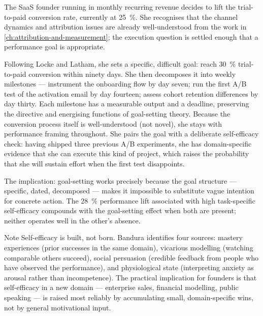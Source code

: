 \begin{example}
The SaaS founder running  in monthly recurring revenue decides to lift the
trial-to-paid conversion rate, currently at \qty{25}{\percent}. She recognises that the channel
dynamics and attribution issues are already well-understood from the work in
\cref{ch:attribution-and-measurement}; the execution question is settled enough that a
performance goal is appropriate.

Following Locke and Latham, she sets a specific, difficult goal: reach \qty{30}{\percent}
trial-to-paid conversion within ninety days. She then decomposes it into weekly milestones ---
instrument the onboarding flow by day seven; run the first A/B test of the activation email by
day fourteen; assess cohort retention differences by day thirty. Each milestone has a
measurable output and a deadline, preserving the directive and energising functions of
goal-setting theory. Because the conversion process itself is well-understood (not novel), she
stays with performance framing throughout. She pairs the goal with a deliberate self-efficacy
check: having shipped three previous A/B experiments, she has domain-specific evidence that she
can execute this kind of project, which raises the probability that she will sustain effort when
the first test disappoints.

The implication: goal-setting works precisely because the goal structure --- specific, dated,
decomposed --- makes it impossible to substitute vague intention for concrete action. The
\qty{28}{\percent} performance lift associated with high task-specific self-efficacy compounds
with the goal-setting effect when both are present; neither operates well in the other's absence.
\end{example}

\begin{admonition}{Note}
Self-efficacy is built, not born. Bandura identifies four sources: mastery experiences (prior
successes in the same domain), vicarious modelling (watching comparable others succeed),
social persuasion (credible feedback from people who have observed the performance), and
physiological state (interpreting anxiety as arousal rather than incompetence). The practical
implication for founders is that self-efficacy in a new domain --- enterprise sales, financial
modelling, public speaking --- is raised most reliably by accumulating small, domain-specific
wins, not by general motivational input.
\end{admonition}

